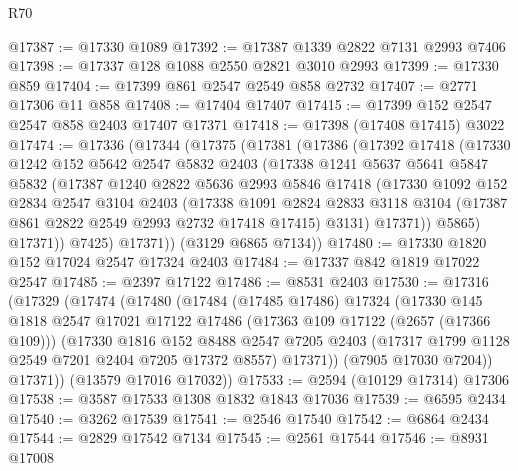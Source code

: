 \begin{lexlean}{R70}
\begin{coremodule}
@17387 := @17330 @1089
@17392 := @17387 @1339 @2822 @7131 @2993 @7406
@17398 := @17337 @128 @1088 @2550 @2821 @3010 @2993
@17399 := @17330 @859
@17404 := @17399 @861 @2547 @2549 @858 @2732
@17407 := @2771 @17306 @11 @858
@17408 := @17404 @17407
@17415 := @17399 @152 @2547 @2547 @858 @2403 @17407 @17371
@17418 := @17398 (@17408 @17415) @3022
@17474 := @17336
    (@17344
      (@17375
        (@17381
          (@17386
            (@17392
              @17418
              (@17330
                @1242
                @152
                @5642
                @2547
                @5832
                @2403
                (@17338
                  @1241
                  @5637
                  @5641
                  @5847
                  @5832
                  (@17387
                    @1240
                    @2822
                    @5636
                    @2993
                    @5846
                    @17418
                    (@17330
                      @1092
                      @152
                      @2834
                      @2547
                      @3104
                      @2403
                      (@17338
                        @1091
                        @2824
                        @2833
                        @3118
                        @3104
                        (@17387 @861 @2822 @2549 @2993 @2732 @17418 @17415)
                        @3131)
                      @17371))
                  @5865)
                @17371))
            @7425)
          @17371))
      (@3129 @6865 @7134))
@17480 := @17330 @1820 @152 @17024 @2547 @17324 @2403
@17484 := @17337 @842 @1819 @17022 @2547
@17485 := @2397 @17122
@17486 := @8531 @2403
@17530 := @17316
    (@17329
      (@17474
        (@17480
          (@17484
            (@17485 @17486)
            @17324
            (@17330
              @145
              @1818
              @2547
              @17021
              @17122
              @17486
              (@17363 @109 @17122 (@2657 (@17366 @109)))
              (@17330
                @1816
                @152
                @8488
                @2547
                @7205
                @2403
                (@17317 @1799 @1128 @2549 @7201 @2404 @7205 @17372 @8557)
                @17371))
            (@7905 @17030 @7204))
          @17371))
      (@13579 @17016 @17032))
@17533 := @2594 (@10129 @17314) @17306
@17538 := @3587 @17533 @1308 @1832 @1843 @17036
@17539 := @6595 @2434
@17540 := @3262 @17539
@17541 := @2546 @17540
@17542 := @6864 @2434
@17544 := @2829 @17542 @7134
@17545 := @2561 @17544
@17546 := @8931 @17008

\end{coremodule}
\end{lexlean}

